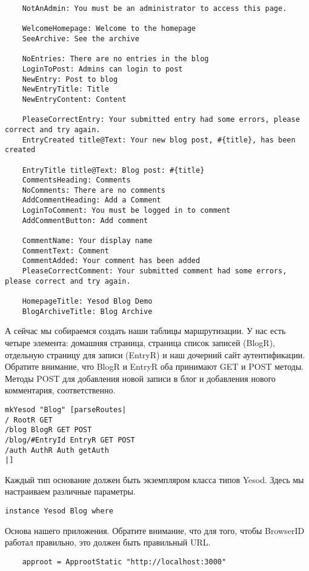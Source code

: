 \begin{lstlisting}
    NotAnAdmin: You must be an administrator to access this page.

    WelcomeHomepage: Welcome to the homepage
    SeeArchive: See the archive

    NoEntries: There are no entries in the blog
    LoginToPost: Admins can login to post
    NewEntry: Post to blog
    NewEntryTitle: Title
    NewEntryContent: Content

    PleaseCorrectEntry: Your submitted entry had some errors, please correct and try again.
    EntryCreated title@Text: Your new blog post, #{title}, has been created

    EntryTitle title@Text: Blog post: #{title}
    CommentsHeading: Comments
    NoComments: There are no comments
    AddCommentHeading: Add a Comment
    LoginToComment: You must be logged in to comment
    AddCommentButton: Add comment

    CommentName: Your display name
    CommentText: Comment
    CommentAdded: Your comment has been added
    PleaseCorrectComment: Your submitted comment had some errors, please correct and try again.

    HomepageTitle: Yesod Blog Demo
    BlogArchiveTitle: Blog Archive
\end{lstlisting}

А сейчас мы собираемся создать наши таблицы маршрутизации. У нас есть четыре элемента: домашняя страница, страница список записей (BlogR), отдельную страницу для записи (EntryR) и наш дочерний сайт аутентификации. Обратите внимание, что BlogR и EntryR оба принимают GET и POST методы. Методы POST для добавления новой записи в блог и добавления нового комментария, соответственно.
 
\begin{lstlisting}
mkYesod "Blog" [parseRoutes|
/ RootR GET
/blog BlogR GET POST
/blog/#EntryId EntryR GET POST
/auth AuthR Auth getAuth
|]
\end{lstlisting}
 
Каждый тип основание должен быть экземпляром класса типов Yesod. Здесь мы настраиваем различные параметры.
 
\begin{lstlisting}
instance Yesod Blog where
\end{lstlisting}
 
Основа нашего приложения. Обратите внимание, что для того, чтобы BrowserID работал правильно, это должен быть правильный URL.
 
\begin{lstlisting}
    approot = ApprootStatic "http://localhost:3000"
\end{lstlisting}
 
